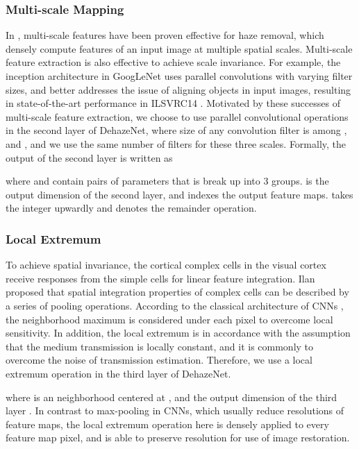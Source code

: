 \documentclass[journal]{IEEEtran}
\begin{document}
\subsubsection{Multi-scale Mapping}
In \cite{rf}, multi-scale features have been proven effective for haze removal, which densely compute features of an input image at multiple spatial scales. Multi-scale feature extraction is also effective to achieve scale invariance. For example, the inception architecture in GoogLeNet \cite{googlenet} uses parallel convolutions with varying filter sizes, and better addresses the issue of aligning objects in input images, resulting in state-of-the-art performance in ILSVRC14 \cite{ilsvrc}. Motivated by these successes of multi-scale feature extraction,  we choose to use parallel convolutional operations in the second layer of DehazeNet, where size of any convolution filter is among {,  and }, and we use the same number of filters for these three scales. Formally, the output of the second layer is written as

where  and  contain  pairs of parameters that is break up into 3 groups.  is the output dimension of the second layer, and  indexes the output feature maps.  takes the integer upwardly and  denotes the remainder operation.

\subsubsection{Local Extremum}
To achieve spatial invariance, the cortical complex cells in the visual cortex receive responses from the simple cells for linear feature integration. Ilan \etal \cite{maxpool} proposed that spatial integration properties of complex cells can be described by a series of pooling operations. According to the classical architecture of CNNs \cite{lenet}, the neighborhood maximum is considered under each pixel to overcome local sensitivity. In addition, the local extremum is in accordance with the assumption that the medium transmission is locally constant, and it is commonly to overcome the noise of transmission estimation. Therefore, we use a local extremum operation in the third layer of DehazeNet.

where  is an  neighborhood centered at , and the output dimension of the third layer . In contrast to max-pooling in CNNs, which usually reduce resolutions of feature maps, the local extremum operation here is densely applied to every feature map pixel, and is able to preserve resolution for use of image restoration.
\end{document}
